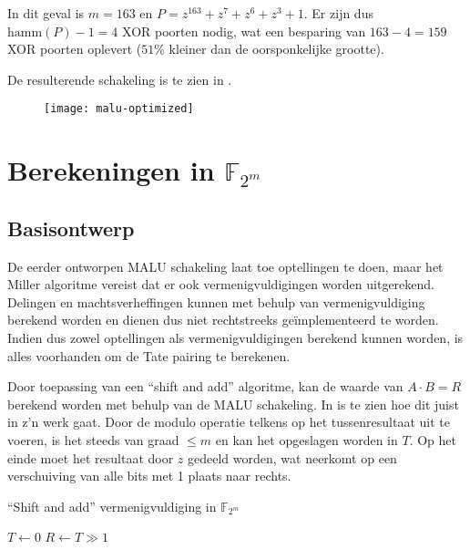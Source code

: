 In dit geval is $m = 163$ en $P = z^{163} + z^7 + z^6 + z^3 + 1$. Er zijn dus $\text{hamm}(P) - 1 = 4$ XOR poorten nodig, wat een besparing van $163 - 4 =  159$ XOR poorten oplevert ($51\%$ kleiner dan de oorsponkelijke grootte).

De resulterende schakeling is te zien in .

\begin{figure}[h]
	\begin{center}
		\texttt{[image: malu-optimized]}
		\label{figuur-implementatie-malu-optimized}
	\end{center}
\end{figure}

\section{Berekeningen in $\mathbb{F}_{2^m}$}\label{sectie-implementatie-gf2m}

\subsection{Basisontwerp}\label{subsectie-implementatie-gf2m-basisontwerp}

De eerder ontworpen MALU schakeling laat toe optellingen te doen, maar het Miller algoritme vereist dat er ook vermenigvuldigingen worden uitgerekend. Delingen en machtsverheffingen kunnen met behulp van vermenigvuldiging berekend worden en dienen dus niet rechtstreeks ge\"implementeerd te worden. Indien dus zowel optellingen als vermenigvuldigingen berekend kunnen worden, is alles voorhanden om de Tate pairing te berekenen.

Door toepassing van een ``shift and add'' algoritme, kan de waarde van \mbox{$A \cdot B = R$} berekend worden met behulp van de MALU schakeling. In  is te zien hoe dit juist in z'n werk gaat. Door de modulo operatie telkens op het tussenresultaat uit te voeren, is het steeds van graad $\leq m$ en kan het opgeslagen worden in $T$. Op het einde moet het resultaat door $z$ gedeeld worden, wat neerkomt op een verschuiving van alle bits met 1 plaats naar rechts.

\begin{algorithm}[h]
\caption{``Shift and add'' vermenigvuldiging in $\mathbb{F}_{2^m}$}
\label{algoritme-implementatie-gf2m-multiply}

	$T \leftarrow 0$\;
	$R \leftarrow T \gg 1$\;
\end{algorithm}


